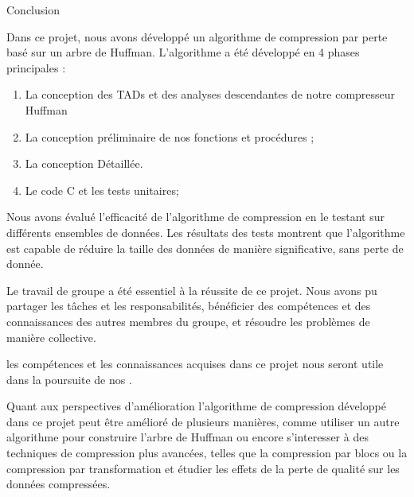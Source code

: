 Conclusion

Dans ce projet, nous avons développé un algorithme de compression par perte basé sur un arbre de Huffman. L'algorithme a été développé en 4 phases principales :

   \begin{enumerate}
\item La conception des TADs et des analyses descendantes de notre compresseur Huffman
\item La conception préliminaire de nos fonctions et procédures ;
\item La conception Détaillée.
\item Le code C et les tests unitaires;
\end{enumerate}

Nous avons évalué l'efficacité de l'algorithme de compression en le testant sur différents ensembles de données. Les résultats des tests montrent que l'algorithme est capable de réduire la taille des données de manière significative, sans perte de donnée.

Le travail de groupe a été essentiel à la réussite de ce projet. Nous avons pu partager les tâches et les responsabilités, bénéficier des compétences et des connaissances des autres membres du groupe, et résoudre les problèmes de manière collective.

les compétences et les connaissances acquises dans ce projet nous seront utile dans la poursuite de nos .

Quant aux perspectives d'amélioration l'algorithme de compression développé dans ce projet peut être amélioré de plusieurs manières, comme utiliser un autre algorithme pour construire l'arbre de Huffman ou encore s'interesser à des techniques de compression plus avancées, telles que la compression par blocs ou la compression par transformation et étudier les effets de la perte de qualité sur les données compressées.
